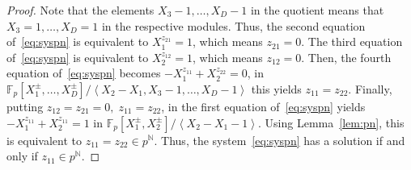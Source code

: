 \documentclass[letterpaper, 11pt, thm-restate]{article}
\numberwithin{equation}{section}
\newcommand{\N}{\mathbb{N}}
\newcommand{\F}{\mathbb{F}}
\newcommand{\gen}[1]{\left\langle {#1} \right\rangle}
\theoremstyle{definition}
\theoremstyle{definition}
\theoremstyle{definition}
\begin{document}
\begin{proof}
    Note that the elements $X_3 - 1, \ldots, X_D - 1$ in the quotient means that $X_3 = 1, \ldots, X_D = 1$ in the respective modules.
    Thus, the second equation of~\eqref{eq:syspn} is equivalent to $X_1^{z_{21}} = 1$, which means $z_{21} = 0$.
    The third equation of~\eqref{eq:syspn} is equivalent to $X_2^{z_{12}} = 1$, which means $z_{12} = 0$.
    Then, the fourth equation of~\eqref{eq:syspn} becomes $- X_1^{z_{11}} + X_2^{z_{22}} = 0$, in $\F_p[X_1^{\pm}, \ldots, X_D^{\pm}]/\gen{X_2 - X_1, X_3 - 1, \ldots, X_D - 1}$ this yields $z_{11} = z_{22}$.
    Finally, putting $z_{12} = z_{21} = 0,\; z_{11} = z_{22}$, in the first equation of~\eqref{eq:syspn} yields $- X_1^{z_{11}} + X_2^{z_{11}} = 1$ in $\F_p[X_1^{\pm}, X_2^{\pm}]/\gen{X_2 - X_1 - 1}$.
    Using Lemma~\ref{lem:pn}, this is equivalent to $z_{11} = z_{22} \in p^{\N}$.
    Thus, the system~\eqref{eq:syspn} has a solution if and only if $z_{11} \in p^{\N}$.
\end{proof}
\end{document}
